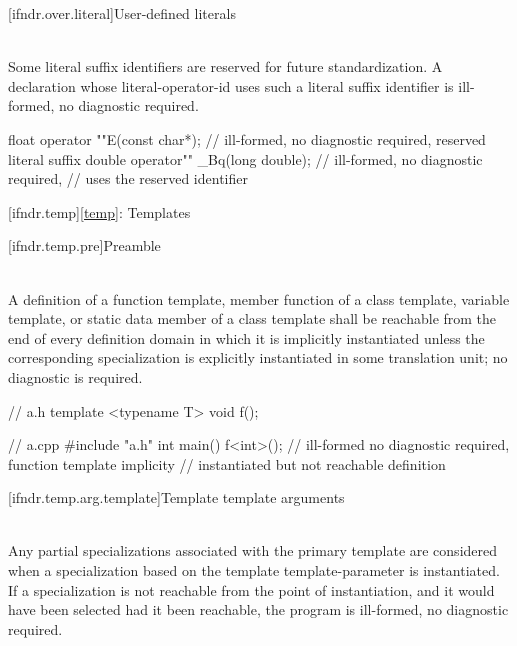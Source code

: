 [ifndr.over.literal]{User-defined literals}

\pnum
{} \\
Some literal suffix identifiers are
reserved for future standardization. A declaration whose literal-operator-id uses such a literal
suffix identifier is ill-formed, no diagnostic required.

\pnum
\begin{example}
\begin{codeblock}
float operator ""E(const char*);        // ill-formed, no diagnostic required, reserved literal suffix
double operator"" _Bq(long double);     // ill-formed, no diagnostic required, // uses the reserved identifier 
\end{codeblock}
\end{example}

[ifndr.temp]{\ref{temp}: Templates}

[ifndr.temp.pre]{Preamble}

\pnum
{} \\
A definition of a function template, member function of a class template, variable template, or static data
member of a class template shall be reachable from the end of every definition domain in which it is
implicitly instantiated unless the corresponding specialization is explicitly instantiated in
some translation unit; no diagnostic is required.

\pnum
\begin{example}
\begin{codeblock}
// a.h
template <typename T>
void f();

// a.cpp
#include "a.h"
int main() {
    f<int>();   // ill-formed no diagnostic required, function template implicity
                // instantiated but not reachable definition
}
\end{codeblock}
\end{example}


[ifndr.temp.arg.template]{Template template arguments}

\pnum
{} \\
Any partial specializations associated with the primary template are considered when a specialization
based on the template template-parameter is instantiated. If a specialization is not reachable from the point of
instantiation, and it would have been selected had it been reachable, the program is ill-formed, no diagnostic
required.

